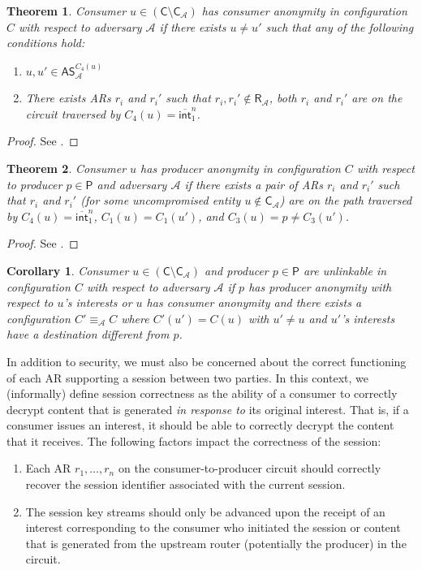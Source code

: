 \documentclass[10pt]{article}
\newtheorem{thm}{\textbf{Theorem}}
\newtheorem{cor}{\textbf{Corollary}}
\begin{document}
\begin{thm}
Consumer $u \in (\mathsf{C} \setminus \mathsf{C}_{\mathcal{A}})$ has consumer anonymity in configuration $C$ with respect to adversary $\mathcal{A}$ if there exists $u \not= u'$ such that any of the following conditions hold:
\begin{enumerate}
	\item $u, u' \in \mathsf{AS}_{\mathcal{A}}^{C_4(u)}$
	\item There exists ARs $r_i$ and $r_i'$ such that $r_i,r_i' \notin \mathsf{R}_{\mathcal{A}}$, both $r_i$ and $r_i'$ are on the circuit traversed by $C_4(u) = \overline{\mathsf{int}}_1^n$.
\end{enumerate}
\end{thm}
\begin{proof}
See \cite{andana}.
\end{proof}

\begin{thm}
Consumer $u$ has producer anonymity in configuration $C$ with respect to producer $p \in \mathsf{P}$ and adversary $\mathcal{A}$ if there exists a pair of ARs $r_i$ and $r_i'$ such that $r_i$ and $r_i'$ (for some uncompromised entity $u \notin \mathsf{C}_{\mathcal{A}}$) are on the path traversed by $C_4(u) = \overline{\mathsf{int}}_1^n$, $C_1(u) = C_1(u')$, and $C_3(u) = p \not= C_3(u')$.
\end{thm}
\begin{proof}
See \cite{andana}.
\end{proof}

\begin{cor}
Consumer $u \in (\mathsf{C} \setminus \mathsf{C}_{\mathcal{A}})$ and producer $p \in \mathsf{P}$ are unlinkable in configuration $C$ with respect to adversary $\mathcal{A}$ if $p$ has producer anonymity with respect to $u$'s interests or $u$ has consumer anonymity and there exists a configuration $C' \equiv_{\mathcal{A}} C$ where $C'(u') = C(u)$ with $u' \not= u$ and $u'$'s interests have a destination different from $p$. 
\end{cor}

In addition to security, we must also be concerned about the correct functioning of each AR supporting a session between two parties. In this context, we (informally) define session correctness as the ability of a consumer to correctly decrypt content that is generated \emph{in response to} its original interest. That is, if a consumer issues an interest, it should be able to correctly decrypt the content that it receives. The following factors impact the correctness of the session:
\begin{enumerate}
  \item Each AR $r_1,\dots,r_n$ on the consumer-to-producer circuit should correctly recover the session identifier associated with the current session. 
  \item The session key streams should only be advanced upon the receipt of an interest corresponding to the consumer who initiated the session or content that is generated from the upstream router (potentially the producer) in the circuit.
\end{enumerate}
\end{document}
